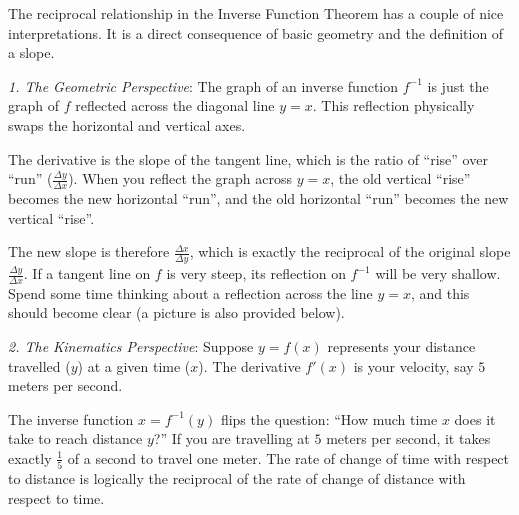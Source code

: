 \documentclass[../analysis1.tex]{subfiles}
\begin{document}
\begin{remark}
    The reciprocal relationship in the Inverse Function Theorem has a couple of nice interpretations. It is a direct consequence of basic geometry and the definition of a slope. 

    \textit{1. The Geometric Perspective}:
    The graph of an inverse function $f^{-1}$ is just the graph of $f$ reflected across the diagonal line $y = x$. This reflection physically swaps the horizontal and vertical axes. 
    
    The derivative is the slope of the tangent line, which is the ratio of ``rise'' over ``run'' ($\frac{\Delta y}{\Delta x}$). When you reflect the graph across $y = x$, the old vertical ``rise'' becomes the new horizontal ``run'', and the old horizontal ``run'' becomes the new vertical ``rise''. 
    
    The new slope is therefore $\frac{\Delta x}{\Delta y}$, which is exactly the reciprocal of the original slope $\frac{\Delta y}{\Delta x}$. If a tangent line on $f$ is very steep, its reflection on $f^{-1}$ will be very shallow. Spend some time thinking about a reflection across the line $y=x$, and this should become clear (a picture is also provided below).

    \textit{2. The Kinematics Perspective}:
    Suppose $y = f(x)$ represents your distance travelled ($y$) at a given time ($x$). The derivative $f'(x)$ is your velocity, say $5$ meters per second. 
    
    The inverse function $x = f^{-1}(y)$ flips the question: ``How much time $x$ does it take to reach distance $y$?'' If you are travelling at $5$ meters per second, it takes exactly $\frac{1}{5}$ of a second to travel one meter. The rate of change of time with respect to distance is logically the reciprocal of the rate of change of distance with respect to time.
\end{remark}
\end{document}
